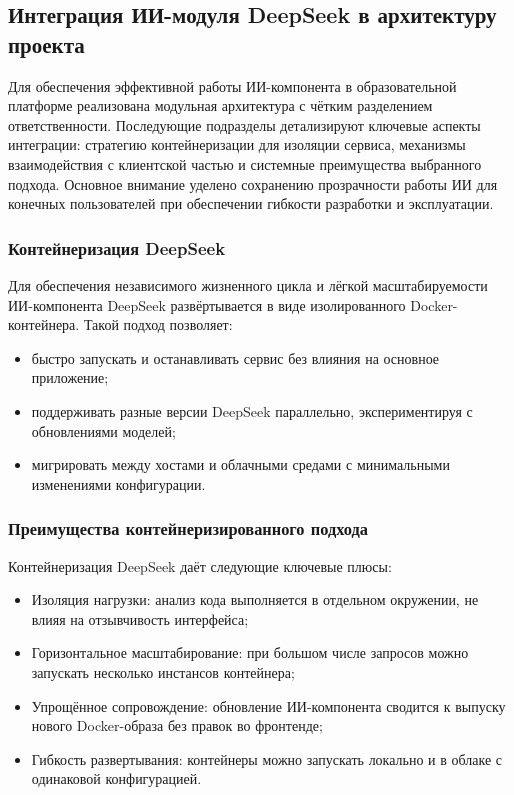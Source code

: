 \subsection{Интеграция ИИ-модуля DeepSeek в архитектуру проекта}

Для обеспечения эффективной работы ИИ-компонента в образовательной платформе реализована модульная архитектура с чётким разделением ответственности. Последующие подразделы детализируют ключевые аспекты интеграции: стратегию контейнеризации для изоляции сервиса, механизмы взаимодействия с клиентской частью и системные преимущества выбранного подхода. Основное внимание уделено сохранению прозрачности работы ИИ для конечных пользователей при обеспечении гибкости разработки и эксплуатации.

\subsubsection{Контейнеризация DeepSeek}
Для обеспечения независимого жизненного цикла и лёгкой масштабируемости ИИ-компонента DeepSeek развёртывается в виде изолированного Docker-контейнера. Такой подход позволяет:

\begin{itemize}
  \item быстро запускать и останавливать сервис без влияния на основное приложение;
  \item поддерживать разные версии DeepSeek параллельно, экспериментируя с обновлениями моделей;
  \item мигрировать между хостами и облачными средами с минимальными изменениями конфигурации.
\end{itemize}

\subsubsection{Преимущества контейнеризированного подхода}
Контейнеризация DeepSeek даёт следующие ключевые плюсы:
\begin{itemize}
  \item Изоляция нагрузки: анализ кода выполняется в отдельном окружении, не влияя на отзывчивость интерфейса;
  \item Горизонтальное масштабирование: при большом числе запросов можно запускать несколько инстансов контейнера;
  \item Упрощённое сопровождение: обновление ИИ-компонента сводится к выпуску нового Docker-образа без правок во фронтенде;
  \item Гибкость развертывания: контейнеры можно запускать локально и в облаке с одинаковой конфигурацией.
\end{itemize}

